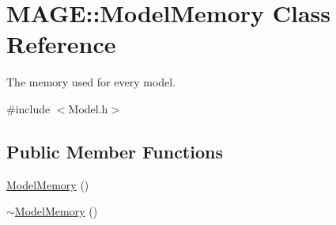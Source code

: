\hypertarget{class_m_a_g_e_1_1_model_memory}{\section{M\-A\-G\-E\-:\-:Model\-Memory Class Reference}
\label{class_m_a_g_e_1_1_model_memory}
}


The memory used for every model.  




{\ttfamily \#include $<$Model.\-h$>$}

\subsection*{Public Member Functions}
\begin{DoxyCompactItemize}
\item 
\hyperlink{class_m_a_g_e_1_1_model_memory_a8e04e25a67664a2a0f5f1f386582a461}{Model\-Memory} ()
\item 
\hyperlink{class_m_a_g_e_1_1_model_memory_adb8e596089647fe32e62039ff3688bf5}{$\sim$\-Model\-Memory} ()
\end{DoxyCompactItemize}
